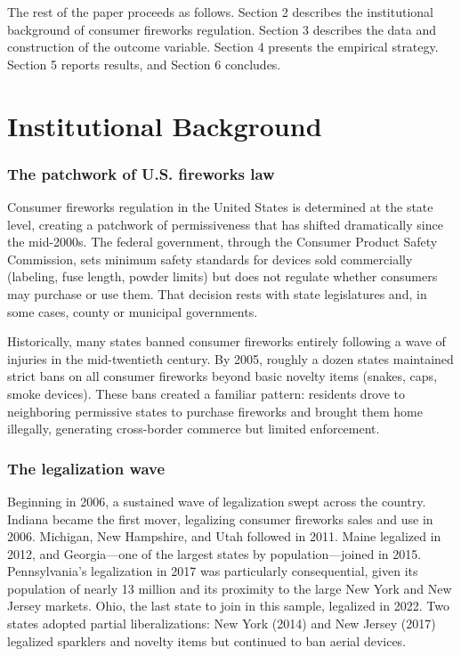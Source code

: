\documentclass[12pt]{article}
\begin{document}
The rest of the paper proceeds as follows. Section 2 describes the institutional background of consumer fireworks regulation. Section 3 describes the data and construction of the outcome variable. Section 4 presents the empirical strategy. Section 5 reports results, and Section 6 concludes.


\section{Institutional Background}

\subsubsection*{The patchwork of U.S. fireworks law} Consumer fireworks regulation in the United States is determined at the state level, creating a patchwork of permissiveness that has shifted dramatically since the mid-2000s. The federal government, through the Consumer Product Safety Commission, sets minimum safety standards for devices sold commercially (labeling, fuse length, powder limits) but does not regulate whether consumers may purchase or use them. That decision rests with state legislatures and, in some cases, county or municipal governments.

Historically, many states banned consumer fireworks entirely following a wave of injuries in the mid-twentieth century. By 2005, roughly a dozen states maintained strict bans on all consumer fireworks beyond basic novelty items (snakes, caps, smoke devices). These bans created a familiar pattern: residents drove to neighboring permissive states to purchase fireworks and brought them home illegally, generating cross-border commerce but limited enforcement.

\subsubsection*{The legalization wave} Beginning in 2006, a sustained wave of legalization swept across the country. Indiana became the first mover, legalizing consumer fireworks sales and use in 2006. Michigan, New Hampshire, and Utah followed in 2011. Maine legalized in 2012, and Georgia---one of the largest states by population---joined in 2015. Pennsylvania's legalization in 2017 was particularly consequential, given its population of nearly 13 million and its proximity to the large New York and New Jersey markets. Ohio, the last state to join in this sample, legalized in 2022. Two states adopted partial liberalizations: New York (2014) and New Jersey (2017) legalized sparklers and novelty items but continued to ban aerial devices.
\end{document}
